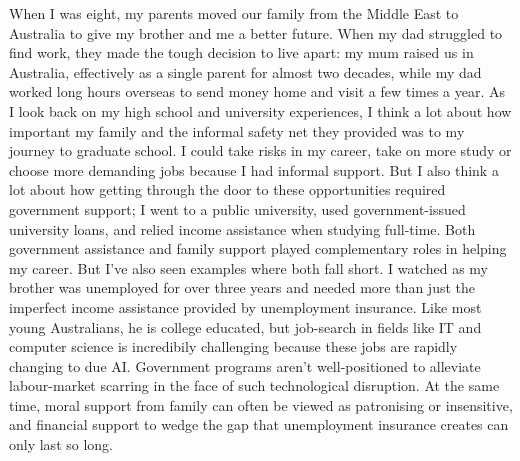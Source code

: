 When I was eight, my parents moved our family from the Middle East to Australia to give my brother and me a better future. When my dad struggled to find work, they made the tough decision to live apart: my mum raised us in Australia, effectively as a single parent for almost two decades, while my dad worked long hours overseas to send money home and visit a few times a year.
\psbreak
As I look back on my high school and university experiences, I think a lot about how important my family and the informal safety net they provided was to my journey to graduate school. I could take risks in my career, take on more study or choose more demanding jobs because I had informal support. But I also think a lot about how getting through the door to these opportunities required government support; I went to a public university, used government-issued university loans, and relied income assistance when studying full-time. Both government assistance and family support played complementary roles in helping my career.
\psbreak
But I've also seen examples where both fall short. I watched as my brother was unemployed for over three years and needed more than just the imperfect income assistance provided by unemployment insurance. Like most young Australians, he is college educated, but job-search in fields like IT and computer science is incredibily challenging because these jobs are rapidly changing to due AI. Government programs aren't well-positioned to alleviate labour-market scarring in the face of such technological disruption. At the same time, moral support from family can often be viewed as patronising or insensitive, and financial support to wedge the gap that unemployment insurance creates can only last so long.